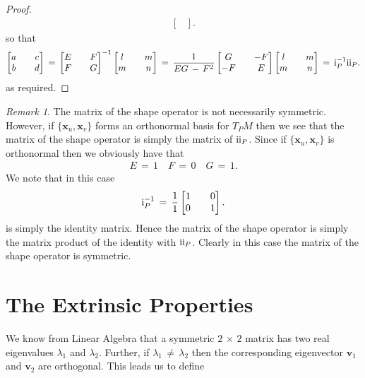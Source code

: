 \documentclass{UKZNcomp}
\newcommand{\vect}[1]{\mathbf{#1}} %
\newcommand{\RN}[1]{%
  \textup{\uppercase\expandafter{\romannumeral#1}}%
}
\theoremstyle{definition}
\theoremstyle{remark}
\newtheorem*{remark}{Remark}
\begin{document}
\begin{proof}
\begin{align*}
\begin{bmatrix}
\end{bmatrix}.
\end{align*}
so that
\begin{align*}
\begin{bmatrix}
a && c\\
b && d
\end{bmatrix}
\,=\,
\begin{bmatrix}
E && F\\
F && G
\end{bmatrix}^{-1}
\begin{bmatrix}
l && m\\
m && n
\end{bmatrix}
\,=\,\dfrac{1}{EG\,-\,F^2}
\begin{bmatrix}
G && -F\\
-F && E
\end{bmatrix}
\begin{bmatrix}
l && m\\
m && n
\end{bmatrix}
\,=\,\RN{1}_P^{-1}\RN{2}_P.
\end{align*}
as required.
\end{proof}
\begin{remark}
The matrix of the shape operator is not necessarily symmetric. However, if $\{\vect x_u,\vect x_v\}$ forms an orthonormal basis for $T_PM$ then we see that the matrix of the shape operator is simply the matrix of $\RN{2}_P$. Since if $\{\vect x_u,\vect x_v\}$ is orthonormal then we obviously have that
\begin{align*}
E\,=\,1\quad F\,=\,0 \quad G\,=\,1.
\end{align*}
We note that in this case 
\begin{align*}
\RN{1}_P^{-1}\,=\, \dfrac{1}{1}
\begin{bmatrix}
1 && 0\\
0 && 1
\end{bmatrix}.
\end{align*}
is simply the identity matrix. Hence the matrix of the shape operator is simply the matrix product of the identity with $\RN{2}_P$. Clearly in this case the matrix of the shape operator is symmetric.
\end{remark}

\section{The Extrinsic Properties}
We know from Linear Algebra that a symmetric $2\,\times\,2$ matrix has two real eigenvalues $\lambda_1$ and $\lambda_2$. Further, if $\lambda_1\,\neq\,\lambda_2$ then the corresponding eigenvector $\vect v_1$ and $\vect v_2$ are orthogonal. This leads us to define
\end{document}
